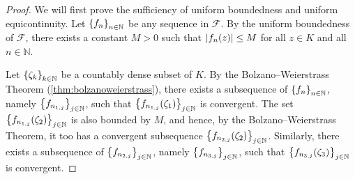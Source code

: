 \begin{proof}
    We will first prove the sufficiency of uniform boundedness and uniform equicontinuity. Let \(\cbraces{f_n}_{n\in\mathbb{N}}\) be any sequence in \(\mathcal{F}\). By the uniform boundedness of \(\mathcal{F}\), there exists a constant \(M>0\) such that \(\abs{f_n(z)}\leq M\) for all \(z\in K\) and all \(n\in\mathbb{N}\).

    Let \(\cbraces{\zeta_k}_{k\in\mathbb{N}}\) be a countably dense subset of \(K\). By the Bolzano--Weierstrass Theorem (\cref{thm:bolzanoweierstrass}), there exists a subsequence of \(\cbraces{f_n}_{n\in\mathbb{N}}\), namely \(\cbraces{f_{n_{1,j}}}_{j\in\mathbb{N}}\), such that \(\cbraces{f_{n_{1,j}}\qty(\zeta_1)}_{j\in\mathbb{N}}\) is convergent. The set \(\cbraces{f_{n_{1,j}}\qty(\zeta_2)}_{j\in\mathbb{N}}\) is also bounded by \(M\), and hence, by the Bolzano--Weierstrass Theorem, it too has a convergent subsequence \(\cbraces{f_{n_{2,j}}\qty(\zeta_2)}_{j\in\mathbb{N}}\). Similarly, there exists a subsequence of \(\cbraces{f_{n_{2,j}}}_{j\in\mathbb{N}}\), namely \(\cbraces{f_{n_{3,j}}}_{j\in\mathbb{N}}\), such that \(\cbraces{f_{n_{3,j}}\qty(\zeta_3)}_{j\in\mathbb{N}}\) is convergent.


\end{proof}
